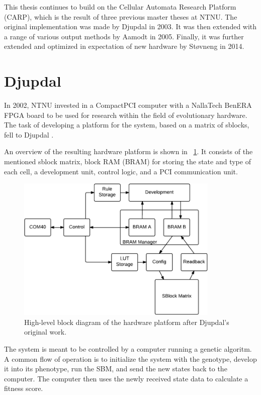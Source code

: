 This thesis continues to build on the Cellular Automata Research Platform (CARP), which is the result of three previous master theses at NTNU.
The original implementation was made by Djupdal in 2003.
It was then extended with a range of various output methods by Aamodt in 2005.
Finally, it was further extended and optimized in expectation of new hardware by Støvneng in 2014.


\section{Djupdal}

In 2002, NTNU invested in a CompactPCI computer with a NallaTech BenERA FPGA board to be used for research within the field of evolutionary hardware.
The task of developing a platform for the system, based on a matrix of sblocks, fell to Djupdal \cite{djupdal2003sblock}.

An overview of the resulting hardware platform is shown in \figurename~\ref{fig:overview-djupdal}.
It consists of the mentioned sblock matrix, block RAM (BRAM) for storing the state and type of each cell, a development unit, control logic, and a PCI communication unit.

\begin{figure}[!ht]
    \centering
    \includegraphics[width=0.86\textwidth]{figures/overview-djupdal}
    \caption[Djupdal's hardware design.]{
        High-level block diagram of the hardware platform after Djupdal's original work.
    }
    \label{fig:overview-djupdal}
\end{figure}

The system is meant to be controlled by a computer running a genetic algoritm.
A common flow of operation is to initialize the system with the genotype, develop it into its phenotype, run the SBM, and send the new states back to the computer.
The computer then uses the newly received state data to calculate a fitness score.

